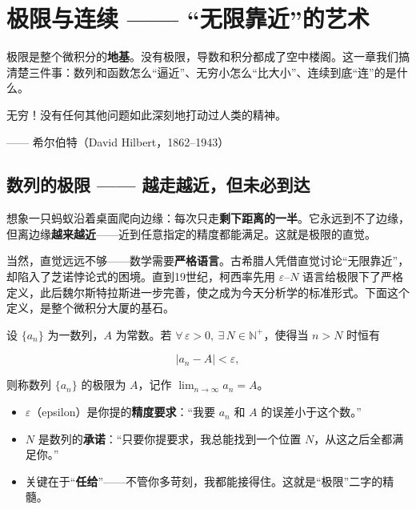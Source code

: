 \documentclass[11pt,a4paper]{article}
\newcommand{\qattr}[1]{{\normalfont\upshape\small\par\raggedleft—— #1\par}}
\newcommand{\keyw}[1]{\colorbox{cYellowL}{\textbf{\color{cOrange}#1}}}
\begin{document}
\section{极限与连续 —— “无限靠近”的艺术}

\begin{leadbox}[本章导读]
极限是整个微积分的\keyw{地基}。没有极限，导数和积分都成了空中楼阁。这一章我们搞清楚三件事：数列和函数怎么“逼近”、无穷小怎么“比大小”、连续到底“连”的是什么。
\end{leadbox}

\begin{quotebox}
无穷！没有任何其他问题如此深刻地打动过人类的精神。
\qattr{希尔伯特（David Hilbert，1862--1943）}
\end{quotebox}

\subsection{数列的极限 —— 越走越近，但未必到达}

想象一只蚂蚁沿着桌面爬向边缘：每次只走\textbf{剩下距离的一半}。它永远到不了边缘，但离边缘\textbf{越来越近}——近到任意指定的精度都能满足。这就是极限的直觉。

当然，直觉远远不够——数学需要\textbf{严格语言}。古希腊人凭借直觉讨论“无限靠近”，却陷入了芝诺悖论式的困境。直到19世纪，柯西率先用 $\varepsilon$–$N$ 语言给极限下了严格定义，此后魏尔斯特拉斯进一步完善，使之成为今天分析学的标准形式。下面这个定义，是整个微积分大厦的基石。

\begin{defbox}
设 $\{a_n\}$ 为一数列，$A$ 为常数。若 $\forall\,\varepsilon>0,\ \exists\,N\in\mathbb{N}^{+}$，使得当 $n>N$ 时恒有
\begin{eqbox}\[ |a_n-A|<\varepsilon, \]\end{eqbox}
则称数列 $\{a_n\}$ 的极限为 $A$，记作 $\displaystyle\lim_{n\to\infty}a_n=A$。
\end{defbox}

\begin{plainbox}
\begin{itemize}[leftmargin=1.4em,itemsep=3pt]
  \item $\varepsilon$（epsilon）是你提的\textbf{精度要求}：“我要 $a_n$ 和 $A$ 的误差小于这个数。”
  \item $N$ 是数列的\textbf{承诺}：“只要你提要求，我总能找到一个位置 $N$，从这之后全都满足你。”
  \item 关键在于“\textbf{任给}”——不管你多苛刻，我都能接得住。这就是“极限”二字的精髓。
\end{itemize}
\end{plainbox}
\end{document}
